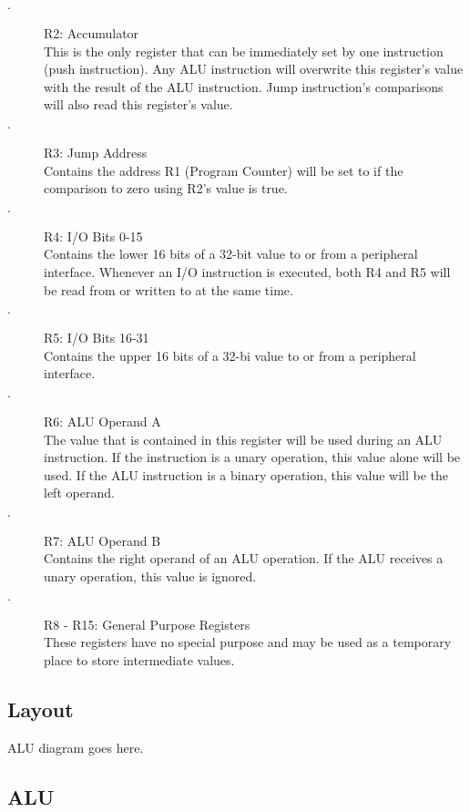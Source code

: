 \documentclass{article}
\begin{document}
			\begin{description}
				\item[$\cdot$] R2: Accumulator\\
				This is the only register that can be immediately set by one instruction (push instruction). Any ALU instruction will overwrite this register's value with the result of the ALU instruction. Jump instruction's comparisons will also read this register's value.
				\item[$\cdot$] R3: Jump Address\\
				Contains the address R1 (Program Counter) will be set to if the comparison to zero using R2's value is true.
				\item[$\cdot$] R4: I/O Bits 0-15\\
				Contains the lower 16 bits of a 32-bit value to or from a peripheral interface. Whenever an I/O instruction is executed, both R4 and R5 will be read from or written to at the same time.
				\item[$\cdot$] R5: I/O Bits 16-31\\
				Contains the upper 16 bits of a 32-bi value to or from a peripheral interface.
				\item[$\cdot$] R6: ALU Operand A\\
				The value that is contained in this register will be used during an ALU instruction. If the instruction is a unary operation, this value alone will be used. If the ALU instruction is a binary operation, this value will be the left operand.
				\item[$\cdot$] R7: ALU Operand B\\
				Contains the right operand of an ALU operation. If the ALU receives a unary operation, this value is ignored.
				\item[$\cdot$] R8 - R15: General Purpose Registers\\
				These registers have no special purpose and may be used as a temporary place to store intermediate values.
				
			\end{description}

		\subsection{Layout}

			ALU diagram goes here.

		\subsection{ALU}
		
\end{document}
